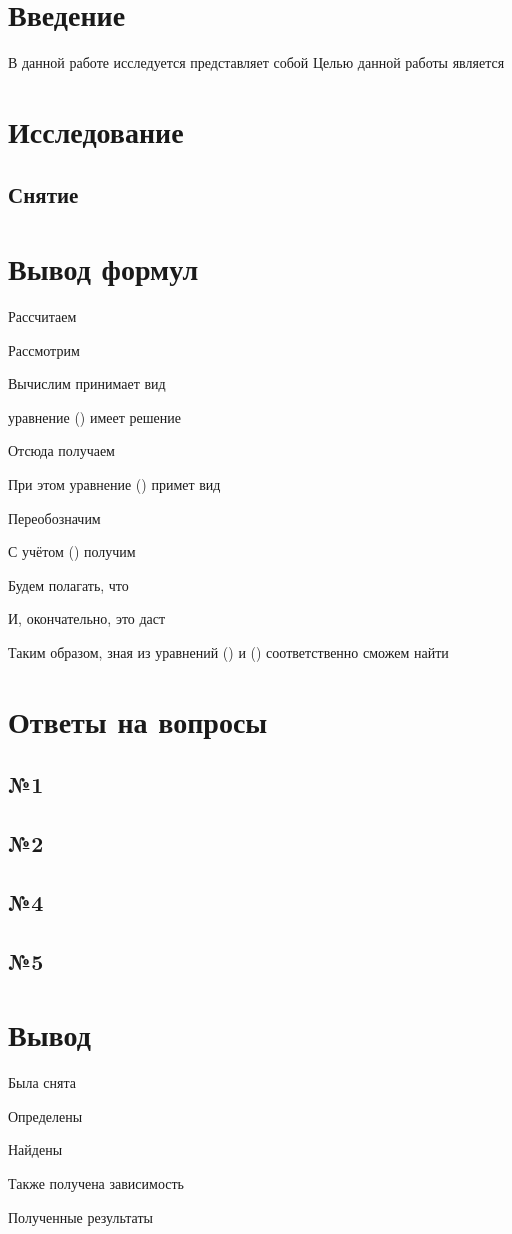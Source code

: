 



\def\labauthors{Понур К.А., Сарафанов Ф.Г., Сидоров Д.А.}
\def\labgroup{420}
\def\labnumber{000}
\def\labtheme{Эффект Холла}



\tableofcontents
\newpage

\section*{Введение}
\label{sec:input}
В данной работе исследуется 
представляет собой
Целью данной работы является 


\newpage
\section{Исследование}
\subsection{Снятие}


\newpage
\section{Вывод формул}
Рассчитаем 

Рассмотрим 

Вычислим
принимает вид

уравнение () имеет решение

Отсюда получаем

При этом уравнение () примет вид

Переобозначим 

С учётом () получим

Будем полагать, что 

И, окончательно, это даст 


Таким образом, зная из уравнений () и () соответственно сможем найти 

\newpage
\section{Ответы на вопросы}

\subsection{№1}
\subsection{№2}
\subsection{№4}
\subsection{№5}


\newpage
\section{Вывод}

Была снята 

Определены 

Найдены 

Также получена зависимость 

Полученные результаты  



